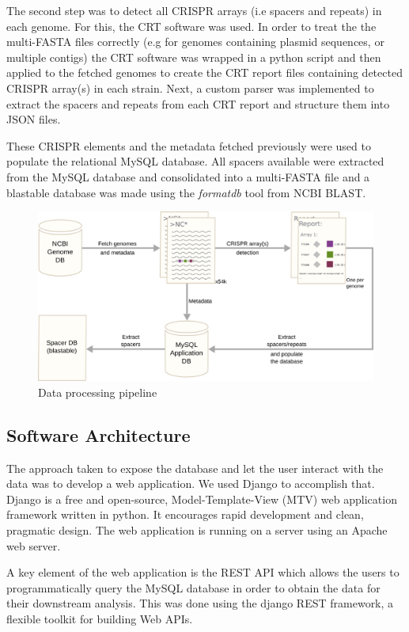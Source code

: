 \documentclass[11pt, a4paper,titlepage]{article}
\begin{document}
The second step was to detect all CRISPR arrays (i.e spacers and
repeats) in each genome. For this, the CRT software
\cite{bland2007crispr} was used. In order to treat the the multi-FASTA
files correctly (e.g for genomes containing plasmid sequences, or
multiple contigs) the CRT software was wrapped in a python script and
then applied to the fetched genomes to create the CRT report files
containing detected CRISPR array(s) in each strain. Next, a custom
parser was implemented to extract the spacers and repeats from each
CRT report and structure them into JSON files.

These CRISPR elements and the metadata fetched previously were used to
populate the relational MySQL database. All spacers available were
extracted from the MySQL database and consolidated into a multi-FASTA
file and a blastable database was made using the \emph{formatdb} tool
from NCBI BLAST.

\begin{figure}
  \centering
  \includegraphics[scale=0.5]{figures/pipeline.png}
  \caption{Data processing pipeline}
\end{figure}

\subsection{Software Architecture}

The approach taken to expose the database and let the user interact
with the data was to develop a web application. We used Django to
accomplish that. Django is a free and open-source, Model-Template-View
(MTV) web application framework written in python. It encourages rapid
development and clean, pragmatic design. The web application is
running on a server using an Apache web server.

A key element of the web application is the REST API which allows the
users to programmatically query the MySQL database in order to obtain
the data for their downstream analysis. This was done using the django
REST framework, a flexible toolkit for building Web APIs.
\end{document}
